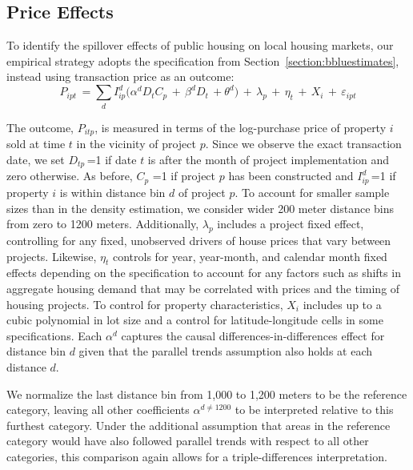 \documentclass[12pt]{article}
\begin{document}
\subsection{Price Effects}\label{section:resultsprices}

To identify the spillover effects of public housing on local housing markets, our empirical strategy adopts the specification from Section~\ref{section:bbluestimates}, instead using transaction price as an outcome:
\begin{equation}
\label{equation:prices}
P_{ipt} \, = \sum\limits_{d} I^d_{ip}\Big( \alpha^d D_tC_p \, + \, \beta^dD_t \, + \theta^{d} \Big) \, + \, \lambda_p \, + \, \eta_t \, + \, X_i \, +  \, \varepsilon_{ipt}
\end{equation}

\noindent The outcome, $P_{itp}$, is measured in terms of the log-purchase price of property $i$ sold at time $t$ in the vicinity of project $p$.  Since we observe the exact transaction date, we set $D_{tp}$\,=1 if date $t$ is after the month of project implementation and zero otherwise.  As before, $C_{p}\,\,$=1 if project $p$ has been constructed and $I^d_{ip}$\,=1 if property $i$ is within distance bin $d$ of project $p$.  To account for smaller sample sizes than in the density estimation, we consider wider 200 meter distance bins from zero to 1200 meters.  Additionally, $\lambda_p$ includes a project fixed effect, controlling for any fixed, unobserved drivers of house prices that vary between projects.  Likewise, $\eta_{t}$ controls for year, year-month, and calendar month fixed effects depending on the specification to account for any factors such as shifts in aggregate housing demand that may be correlated with prices and the timing of housing projects.  To control for property characteristics, $X_i$ includes up to a cubic polynomial in lot size and a control for latitude-longitude cells in some specifications.  Each $\alpha^d$ captures the causal differences-in-differences effect for distance bin $d$ given that the parallel trends assumption also holds at each distance $d$.  

We normalize the last distance bin from 1,000 to 1,200 meters to be the reference category, leaving all other coefficients  $\alpha^{d \neq 1200}$  to be interpreted relative to this furthest category.  Under the additional assumption that areas in the reference category would have also followed parallel trends with respect to all other categories, this comparison again allows for a triple-differences interpretation.  
\end{document}

